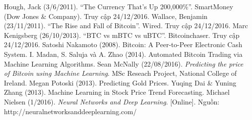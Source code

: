 \documentclass[12pt,a4paper]{report}
\begin{document}
\pagebreak
\begin{thebibliography}{9}

Hough, Jack (3/6/2011). ``The Currency That's Up 200,000\%''. SmartMoney (Dow Jones \& Company). Truy cập 24/12/2016.
Wallace, Benjamin (23/11/2011). ``The Rise and Fall of Bitcoin''. Wired. Truy cập 24/12/2016.
Marc Kenigsberg (26/10/2013). ``BTC vs mBTC vs uBTC''. Bitcoinchaser. Truy cập 24/12/2016.
Satoshi Nakamoto (2008). Bitcoin: A Peer-to-Peer Electronic Cash System.
I. Madan, S. Saluja và A. Zhao (2014). Automated Bitcoin Trading via Machine Learning Algorithms.
Sean McNally (22/08/2016). \emph{Predicting the price of Bitcoin using Machine Learning}. MSc Reseach Project, National College of Ireland.
Megan Potoski (2013). Predicting Gold Prices. 
Yuqing Dai \& Yuning Zhang (2013). Machine Learning in Stock Price Trend Forecasting.
Michael Nielsen (1/2016). \emph{Neural Networks and Deep Learning}. [Online]. Nguồn: http://neuralnetworksanddeeplearning.com/ 
\end{thebibliography}
\end{document}
